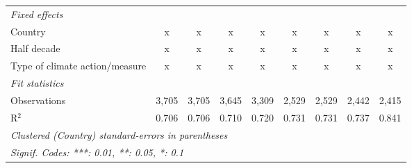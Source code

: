 \begin{table}[htbp]
\begin{tabular}{lcccccccc}
      \emph{Fixed effects}\\
      Country                                                                          & x       & x       & x           & x       & x           & x            & x            & x\\  
      Half decade                                                                      & x       & x       & x           & x       & x           & x            & x            & x\\  
      Type of climate action/measure                                                   & x       & x       & x           & x       & x           & x            & x            & x\\  
      \midrule \emph{Fit statistics}\\
      Observations                                                                     & 3,705   & 3,705   & 3,645       & 3,309   & 2,529       & 2,529        & 2,442        & 2,415\\  
      R$^2$                                                                            & 0.706   & 0.706   & 0.710       & 0.720   & 0.731       & 0.731        & 0.737        & 0.841\\  
      \midrule
      \multicolumn{9}{l}{\emph{Clustered (Country) standard-errors in parentheses}}\\
      \multicolumn{9}{l}{\emph{Signif. Codes: ***: 0.01, **: 0.05, *: 0.1}}\\
   \end{tabular}
\end{table}



